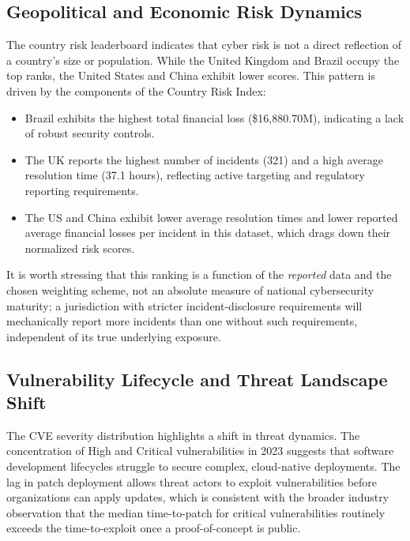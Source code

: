\documentclass[a4paper, 12pt]{report}
\begin{document}
\subsection{Geopolitical and Economic Risk Dynamics}
The country risk leaderboard indicates that cyber risk is not a direct reflection of a country's size or population. While the United Kingdom and Brazil occupy the top ranks, the United States and China exhibit lower scores. This pattern is driven by the components of the Country Risk Index:
\begin{itemize}
    \item Brazil exhibits the highest total financial loss (\$16,880.70M), indicating a lack of robust security controls.
    \item The UK reports the highest number of incidents (321) and a high average resolution time (37.1 hours), reflecting active targeting and regulatory reporting requirements.
    \item The US and China exhibit lower average resolution times and lower reported average financial losses per incident in this dataset, which drags down their normalized risk scores.
\end{itemize}
It is worth stressing that this ranking is a function of the \textit{reported} data and the chosen weighting scheme, not an absolute measure of national cybersecurity maturity; a jurisdiction with stricter incident-disclosure requirements will mechanically report more incidents than one without such requirements, independent of its true underlying exposure.

\subsection{Vulnerability Lifecycle and Threat Landscape Shift}
The CVE severity distribution highlights a shift in threat dynamics. The concentration of High and Critical vulnerabilities in 2023 suggests that software development lifecycles struggle to secure complex, cloud-native deployments. The lag in patch deployment allows threat actors to exploit vulnerabilities before organizations can apply updates, which is consistent with the broader industry observation that the median time-to-patch for critical vulnerabilities routinely exceeds the time-to-exploit once a proof-of-concept is public.
\end{document}
